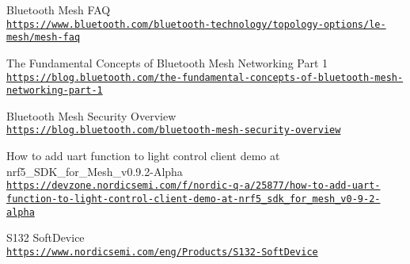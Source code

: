 \begin{thebibliography}{80}
Bluetooth Mesh FAQ
\\\texttt{\url{https://www.bluetooth.com/bluetooth-technology/topology-options/le-mesh/mesh-faq}}

The Fundamental Concepts of Bluetooth Mesh Networking Part 1
\\\texttt{\url{https://blog.bluetooth.com/the-fundamental-concepts-of-bluetooth-mesh-networking-part-1}}

Bluetooth Mesh Security Overview
\\\texttt{\url{https://blog.bluetooth.com/bluetooth-mesh-security-overview}}


How to add uart function to light control client demo at nrf5\_SDK\_for\_Mesh\_v0.9.2-Alpha
\\\texttt{\url{https://devzone.nordicsemi.com/f/nordic-q-a/25877/how-to-add-uart-function-to-light-control-client-demo-at-nrf5\_sdk\_for\_mesh\_v0-9-2-alpha}}

S132 SoftDevice
\\\texttt{\url{https://www.nordicsemi.com/eng/Products/S132-SoftDevice}}


\end{thebibliography}

